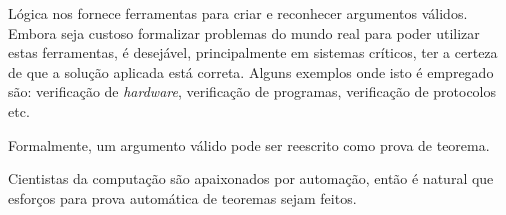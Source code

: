 


Lógica nos fornece ferramentas para criar e reconhecer argumentos válidos. Embora seja custoso %
formalizar problemas do mundo real para poder utilizar estas ferramentas, é desejável, principalmente em sistemas críticos, ter a certeza de que a solução aplicada está correta. Alguns exemplos onde isto é empregado são: verificação de \textit{hardware}, verificação de programas, verificação de protocolos etc. %

Formalmente, um argumento válido pode ser reescrito como prova de teorema.

Cientistas da computação são apaixonados por automação, %
então é natural que esforços para prova automática de teoremas sejam feitos. %

